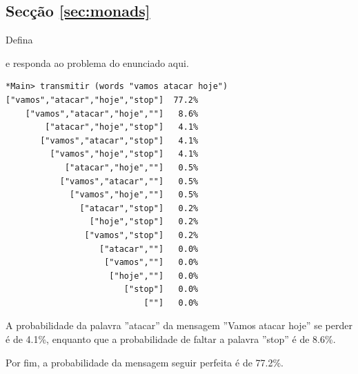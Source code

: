 \documentclass[a4paper]{article}
\newcommand{\Conid}[1]{\mathit{#1}}
\newcommand{\Varid}[1]{\mathit{#1}}
\newcommand{\plus}{\mathbin{+\!\!\!+}}
\def\resethooks{%
  \global\let\SaveRestoreHook\empty
  \global\let\ColumnHook\empty}
\let\hspre\empty
\let\hspost\empty
\begin{document}
\subsection*{Secção \ref{sec:monads}}
Defina
\newline
{}\resethooks
e responda ao problema do enunciado aqui.

\begin{Verbatim}
*Main> transmitir (words "vamos atacar hoje")
["vamos","atacar","hoje","stop"]  77.2%
    ["vamos","atacar","hoje",""]   8.6%
        ["atacar","hoje","stop"]   4.1%
       ["vamos","atacar","stop"]   4.1%
         ["vamos","hoje","stop"]   4.1%
            ["atacar","hoje",""]   0.5%
           ["vamos","atacar",""]   0.5%
             ["vamos","hoje",""]   0.5%
               ["atacar","stop"]   0.2%
                 ["hoje","stop"]   0.2%
                ["vamos","stop"]   0.2%
                   ["atacar",""]   0.0%
                    ["vamos",""]   0.0%
                     ["hoje",""]   0.0%
                        ["stop"]   0.0%
                            [""]   0.0%
\end{Verbatim}

A probabilidade da palavra ''atacar'' da mensagem ''Vamos atacar hoje''
se perder é de 4.1\%, enquanto que a probabilidade de faltar a palavra ''stop'' é de 8.6\%.

Por fim, a probabilidade da mensagem seguir perfeita é de 77.2\%.
\end{document}
